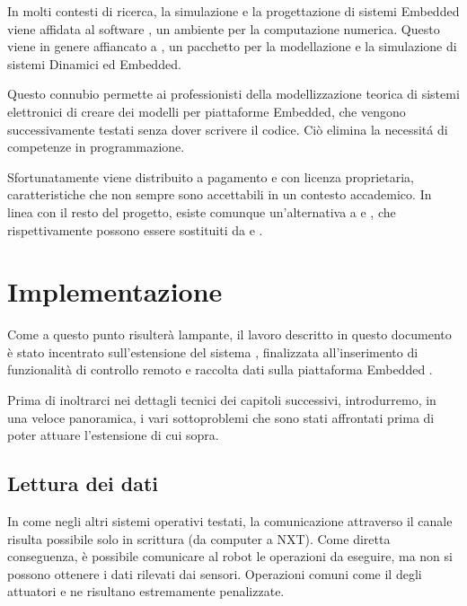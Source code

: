 In molti contesti di ricerca, la simulazione e la progettazione di
sistemi Embedded viene affidata al software , un ambiente
per la computazione numerica. Questo viene in genere affiancato a
, un pacchetto per la modellazione e la simulazione di
sistemi Dinamici ed Embedded.

Questo connubio permette ai professionisti della modellizzazione teorica di
sistemi elettronici di creare dei modelli per piattaforme Embedded, che
vengono successivamente testati senza dover scrivere il codice. Ci\`o
elimina la necessit\'a di competenze in programmazione.

Sfortunatamente  viene distribuito a pagamento e con
licenza proprietaria, caratteristiche che non sempre sono accettabili in
un contesto accademico. In linea con il resto del progetto, esiste
comunque un'alternativa  a  e
, che rispettivamente possono essere sostituiti da
 e .

\section{Implementazione}

Come a questo punto risulter\`a lampante, il lavoro descritto in questo
documento \`e stato incentrato sull'estensione del sistema
, finalizzata all'inserimento di funzionalit\`a di
controllo remoto e raccolta dati sulla piattaforma Embedded \nxt.

Prima di inoltrarci nei dettagli tecnici dei capitoli successivi,
introdurremo, in una veloce panoramica, i vari sottoproblemi che sono
stati affrontati prima di poter attuare l'estensione di cui sopra.

\subsection{Lettura dei dati}

In \nxtOSEK{} come negli altri sistemi operativi testati, la comunicazione
attraverso il canale  risulta possibile solo in scrittura
(da computer a NXT). Come diretta conseguenza, \`e possibile comunicare al
robot le operazioni da eseguire, ma non si possono ottenere i dati rilevati
dai sensori. Operazioni comuni come il  degli
attuatori e  ne risultano estremamente penalizzate.

